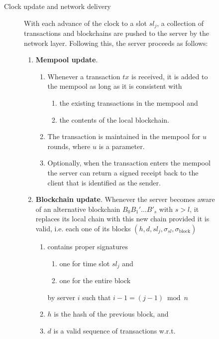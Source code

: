 \begin{figure}
\begin{description}
  \item[Clock update and network delivery] With each advance of the clock to a
  slot $\mathit{sl}_j$, a collection of transactions and blockchains are pushed
  to the server by the network layer. Following this, the server proceeds as
  follows:
  \begin{enumerate}
    \item \textbf{Mempool update}.\label{bft:mempool}
      \begin{enumerate}
        \item \label{bft:mempool:consistency} Whenever a transaction
        $\mathit{tx}$ is received, it is added to the mempool as long as it is
        consistent with
        \begin{enumerate}
          \item the existing transactions in the mempool and
          \item the contents of the local blockchain.
        \end{enumerate}
        \item \label{bft:mempool:ttl} The transaction is maintained in the
        mempool for $u$ rounds, where $u$ is a parameter.
        \item \label{bft:mempool:receipts} Optionally, when the transaction
        enters the mempool the server can return a signed receipt back to the
        client that is identified as the sender.
      \end{enumerate}
%
  \item \textbf{Blockchain update}.\label{bft:update} Whenever the server
  becomes aware of an alternative blockchain
  $B_0 B_1' \ldots B'_s$
  with $s > l$, it replaces its local chain with this new chain provided it is
  valid, i.e. each one of its blocks
  $(h, d, \mathit{sl}_j, \sigma_\mathit{sl}, \sigma_\mathrm{block})$
%
  \begin{enumerate}
    \item \label{bft:update:signatures} contains proper signatures
    \begin{enumerate}
      \item one for time slot $\mathit{sl}_j$ and
      \item one for the entire block
    \end{enumerate}
    by server $i$ such that $i - 1 = (j - 1) \bmod n$
    \item \label{bft:update:hash} $h$ is the hash of the previous block, and
    \item \label{bft:update:body} $d$ is a valid sequence of transactions w.r.t.

\end{enumerate}
\end{enumerate}
\end{description}
\end{figure}
